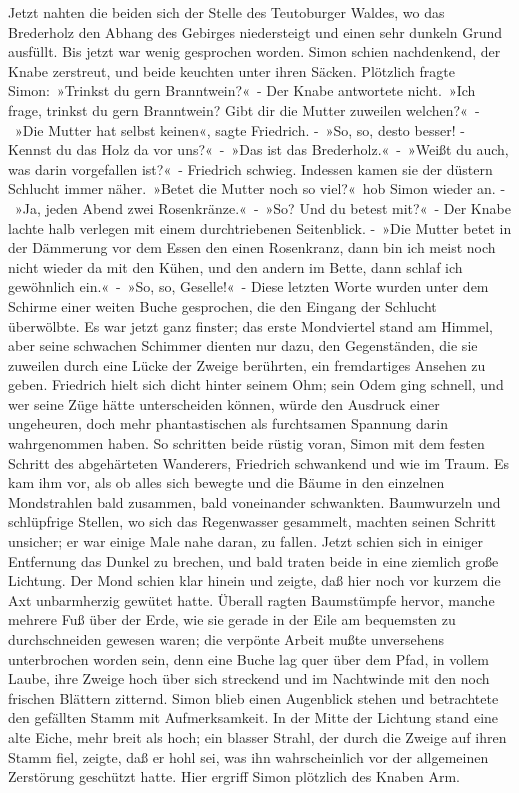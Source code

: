 Jetzt nahten die beiden sich der Stelle des Teutoburger Waldes, wo das Brederholz den Abhang des Gebirges niedersteigt und einen sehr dunkeln Grund ausfüllt. Bis jetzt war wenig gesprochen worden. Simon schien nachdenkend, der Knabe zerstreut, und beide keuchten unter ihren Säcken. Plötzlich fragte Simon: »Trinkst du gern Branntwein?« - Der Knabe antwortete nicht. »Ich frage, trinkst du gern Branntwein? Gibt dir die Mutter zuweilen welchen?« - »Die Mutter hat selbst keinen«, sagte Friedrich. - »So, so, desto besser! - Kennst du das Holz da vor uns?« - »Das ist das Brederholz.« - »Weißt du auch, was darin vorgefallen ist?« - Friedrich schwieg. Indessen kamen sie der düstern Schlucht immer näher. »Betet die Mutter noch so viel?« hob Simon wieder an. - »Ja, jeden Abend zwei Rosenkränze.« - »So? Und du betest mit?« - Der Knabe lachte halb verlegen mit einem durchtriebenen Seitenblick. - »Die Mutter betet in der Dämmerung vor dem Essen den einen Rosenkranz, dann bin ich meist noch nicht wieder da mit den Kühen, und den andern im Bette, dann schlaf ich gewöhnlich ein.« - »So, so, Geselle!« - Diese letzten Worte wurden unter dem Schirme einer weiten Buche gesprochen, die den Eingang der Schlucht überwölbte. Es war jetzt ganz finster; das erste Mondviertel stand am Himmel, aber seine schwachen Schimmer dienten nur dazu, den Gegenständen, die sie zuweilen durch eine Lücke der Zweige berührten, ein fremdartiges Ansehen zu geben. Friedrich hielt sich dicht hinter seinem Ohm; sein Odem ging schnell, und wer seine Züge hätte unterscheiden können, würde den Ausdruck einer ungeheuren, doch mehr phantastischen als furchtsamen Spannung darin wahrgenommen haben. So schritten beide rüstig voran, Simon mit dem festen Schritt des abgehärteten Wanderers, Friedrich schwankend und wie im Traum. Es kam ihm vor, als ob alles sich bewegte und die Bäume in den einzelnen Mondstrahlen bald zusammen, bald voneinander schwankten. Baumwurzeln und schlüpfrige Stellen, wo sich das Regenwasser gesammelt, machten seinen Schritt unsicher; er war einige Male nahe daran, zu fallen. Jetzt schien sich in einiger Entfernung das Dunkel zu brechen, und bald traten beide in eine ziemlich große Lichtung. Der Mond schien klar hinein und zeigte, daß hier noch vor kurzem die Axt unbarmherzig gewütet hatte. Überall ragten Baumstümpfe hervor, manche mehrere Fuß über der Erde, wie sie gerade in der Eile am bequemsten zu durchschneiden gewesen waren; die verpönte Arbeit mußte unversehens unterbrochen worden sein, denn eine Buche lag quer über dem Pfad, in vollem Laube, ihre Zweige hoch über sich streckend und im Nachtwinde mit den noch frischen Blättern zitternd. Simon blieb einen Augenblick stehen und betrachtete den gefällten Stamm mit Aufmerksamkeit. In der Mitte der Lichtung stand eine alte Eiche, mehr breit als hoch; ein blasser Strahl, der durch die Zweige auf ihren Stamm fiel, zeigte, daß er hohl sei, was ihn wahrscheinlich vor der allgemeinen Zerstörung geschützt hatte. Hier ergriff Simon plötzlich des Knaben Arm.

